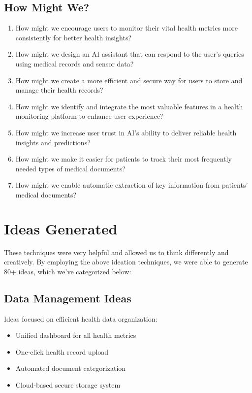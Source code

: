 \subsection{How Might We?}
\begin{enumerate}
    \item How might we encourage users to monitor their vital health metrics more consistently for better health insights?
    \item How might we design an AI assistant that can respond to the user's queries using medical records and sensor data?
    \item How might we create a more efficient and secure way for users to store and manage their health records?
    \item How might we identify and integrate the most valuable features in a health monitoring platform to enhance user experience?
    \item How might we increase user trust in AI's ability to deliver reliable health insights and predictions?
    \item How might we make it easier for patients to track their most frequently needed types of medical documents?
    \item How might we enable automatic extraction of key information from patients' medical documents?
\end{enumerate}

\section{Ideas Generated}
These techniques were very helpful and allowed us to think differently and creatively. By employing the above ideation techniques, we were able to generate 80+ ideas, which we've categorized below:

\subsection{Data Management Ideas}
Ideas focused on efficient health data organization:
\begin{itemize}
    \item Unified dashboard for all health metrics
    \item One-click health record upload
    \item Automated document categorization
    \item Cloud-based secure storage system
\end{itemize}

